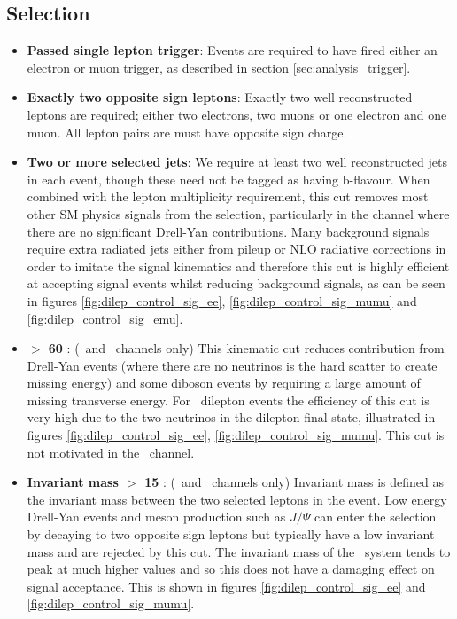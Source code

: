 \subsection*{Selection}
\begin{itemize}

  \item \textbf{Passed single lepton trigger}: Events are required to have fired either an electron or muon trigger, as described in section \ref{sec:analysis_trigger}.

  \item \textbf{Exactly two opposite sign leptons}: Exactly two well reconstructed leptons are required; either two electrons, two muons or one electron and one muon. All lepton pairs are must have opposite sign charge.

  \item \textbf{Two or more selected jets}: We require at least two well reconstructed jets in each event, though these need not be tagged as having b-flavour. When combined with the lepton multiplicity requirement, this cut removes most other SM physics signals from the selection, particularly in the \emu channel where there are no significant Drell-Yan contributions. Many background signals require extra radiated jets either from pileup or NLO radiative corrections in order to imitate the signal kinematics and therefore this cut is highly efficient at accepting signal events whilst reducing background signals, as can be seen in figures \ref{fig:dilep_control_sig_ee}, \ref{fig:dilep_control_sig_mumu} and \ref{fig:dilep_control_sig_emu}.

  \item \textbf{\etmiss $>$ 60 \GeV}: (\ee\ and \mumu\ channels only) This kinematic cut reduces contribution from Drell-Yan events (where there are no neutrinos is the hard scatter to create missing energy) and some diboson events by requiring a large amount of missing transverse energy. For \ttbar\ dilepton events the efficiency of this cut is very high due to the two neutrinos in the dilepton final state, illustrated in figures \ref{fig:dilep_control_sig_ee}, \ref{fig:dilep_control_sig_mumu}. This cut is not motivated in the \emu\ channel.

  \item \textbf{Invariant mass $>$ 15 \GeV}: (\ee\ and \mumu\ channels only)  Invariant mass is defined as the invariant mass between the two selected leptons in the event. Low energy Drell-Yan events and meson production such as $J/\Psi$ can enter the selection by decaying to two opposite sign leptons but typically have a low invariant mass and are rejected by this cut. The invariant mass of the \ttbar\ system tends to peak at much higher values and so this does not have a damaging effect on signal acceptance. This is shown in figures \ref{fig:dilep_control_sig_ee} and \ref{fig:dilep_control_sig_mumu}. 


\end{itemize}

